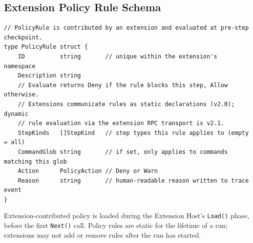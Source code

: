 \subsection{Extension Policy Rule Schema}

\begin{verbatim}
// PolicyRule is contributed by an extension and evaluated at pre-step checkpoint.
type PolicyRule struct {
    ID          string       // unique within the extension's namespace
    Description string
    // Evaluate returns Deny if the rule blocks this step, Allow otherwise.
    // Extensions communicate rules as static declarations (v2.0); dynamic
    // rule evaluation via the extension RPC transport is v2.1.
    StepKinds   []StepKind   // step types this rule applies to (empty = all)
    CommandGlob string       // if set, only applies to commands matching this glob
    Action      PolicyAction // Deny or Warn
    Reason      string       // human-readable reason written to trace event
}
\end{verbatim}

Extension-contributed policy is loaded during the Extension Host's \texttt{Load()} phase,
before the first \texttt{Next()} call. Policy rules are static for the lifetime of a run;
extensions may not add or remove rules after the run has started.
